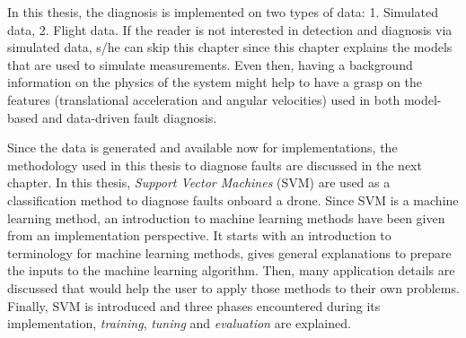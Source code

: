 In this thesis, the diagnosis is implemented on two types of data: 1. Simulated data, 2.
Flight data. 
If the reader is not interested in detection and diagnosis via simulated data, s/he can skip this chapter since this chapter explains the models that are used to simulate measurements.
Even then, having a background information on the physics of the system might help to have a grasp on the features (translational acceleration and angular velocities) used in both model-based and data-driven fault diagnosis.

Since the data is generated and available now for implementations, the methodology used in this thesis to diagnose faults are discussed in the next chapter. 
In this thesis, \emph{Support Vector Machines} (SVM) are used as a classification method to diagnose faults onboard a drone. 
Since SVM is a machine learning method, an introduction to machine learning methods have been given from an implementation perspective. 
It starts with an introduction to terminology for machine learning methods, gives general explanations to prepare the inputs to the machine learning algorithm. 
Then, many application details are discussed that would help the user to apply those methods to their own problems. 
Finally, SVM is introduced and three phases encountered during its implementation, \emph{training}, \emph{tuning} and \emph{evaluation} are explained.
